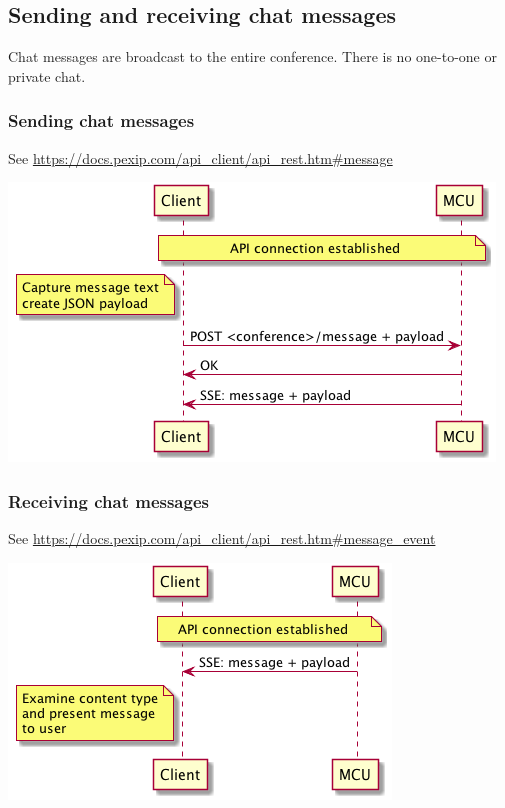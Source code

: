 \documentclass[a4paper,11pt]{article}
\begin{document}
\subsection{Sending and receiving chat messages}
\label{sec:orgheadline18}

Chat messages are broadcast to the entire conference.  There is no
one-to-one or private chat.

\subsubsection{Sending chat messages}
\label{sec:orgheadline16}

See \url{https://docs.pexip.com/api_client/api_rest.htm#message}

\includegraphics[width=.9\linewidth]{images/chat_tx_sequence.png}

\subsubsection{Receiving chat messages}
\label{sec:orgheadline17}

See \url{https://docs.pexip.com/api_client/api_rest.htm#message_event}

\includegraphics[width=.9\linewidth]{images/chat_rx_sequence.png}
\end{document}
